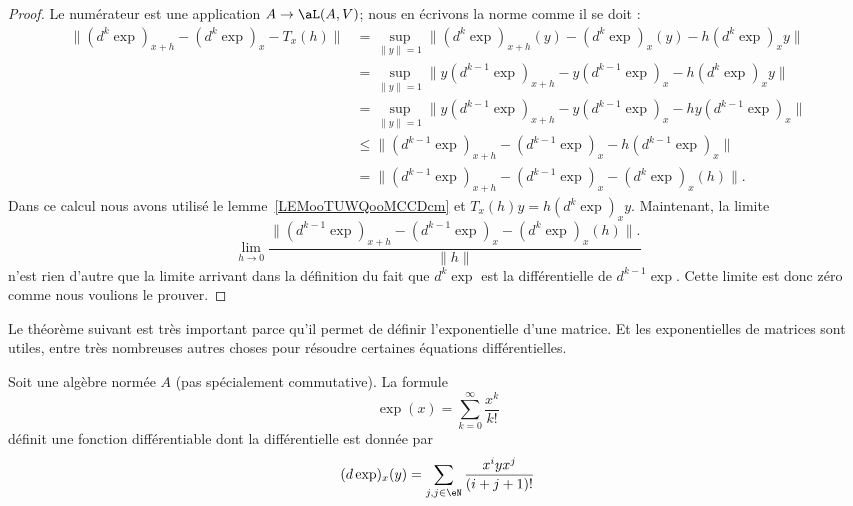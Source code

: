 \begin{proof}
    Le numérateur est une application \( A\to \aL(A,V)\); nous en écrivons la norme comme il se doit :
    \begin{subequations}
        \begin{align}
            \|   (d^k\exp)_{x+h}-(d^k\exp)_x-T_x(h) \|&=\sup_{\| y \|=1}\| (d^{k}\exp)_{x+h}(y)-(d^k\exp)_x(y)-h(d^{k}\exp)_xy \|\\
            &=\sup_{\| y \|=1}\| y(d^{k-1}\exp)_{x+h}-y(d^{k-1}\exp)_x-h(d^k\exp)_xy \|\\
            &=\sup_{\| y \|=1}\| y(d^{k-1}\exp)_{x+h}-y(d^{k-1}\exp)_x-hy(d^{k-1}\exp)_x \|\\
            &\leq \| (d^{k-1}\exp)_{x+h}-(d^{k-1}\exp)_x-h(d^{k-1}\exp)_x \|\\
            &=\| (d^{k-1}\exp)_{x+h}-(d^{k-1}\exp)_x-(d^{k}\exp)_x(h) \|.
        \end{align}
    \end{subequations}
    Dans ce calcul nous avons utilisé le lemme~\ref{LEMooTUWQooMCCDcm} et \( T_x(h)y=h(d^{k}\exp)_xy\).
    Maintenant, la limite
    \begin{equation}
        \lim_{h\to 0} \frac{  \| (d^{k-1}\exp)_{x+h}-(d^{k-1}\exp)_x-(d^{k}\exp)_x(h) \|.}{ \| h \| }
    \end{equation}
    n'est rien d'autre que la limite arrivant dans la définition du fait que \( d^k\exp\) est la différentielle de \( d^{k-1}\exp\). Cette limite est donc zéro comme nous voulions le prouver.
\end{proof}


Le théorème suivant est très important parce qu'il permet de définir l'exponentielle d'une matrice. Et les exponentielles de matrices sont utiles, entre très nombreuses autres choses pour résoudre certaines équations différentielles.
\begin{theoremDef}      \label{THOooFGTQooZPiVLO}
    Soit une algèbre normée \( A\) (pas spécialement commutative). La formule
    \begin{equation}
        \exp(x)=\sum_{k=0}^{\infty}\frac{ x^k }{ k! }
    \end{equation}
    définit une fonction différentiable dont la différentielle est donnée par
    \begin{equation}        \label{EQooFGPPooZKHeXU}
        (d\exp)_x(y)=\sum_{j,j\in \eN}\frac{ x^iyx^j }{ (i+j+1)! }
    \end{equation}
\end{theoremDef}

